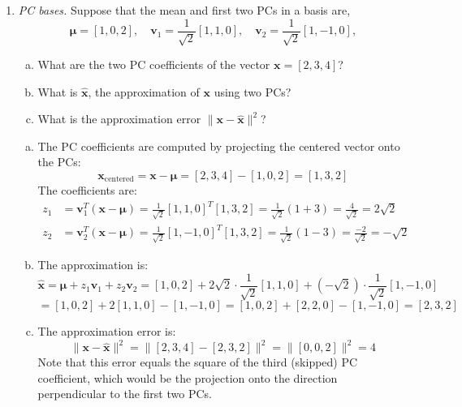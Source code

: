 \documentclass[11pt]{article}
\newcommand{\vbf}{\mathbf{v}}
\newcommand{\xbf}{\mathbf{x}}
\newcommand{\xbfhat}{\widehat{\mathbf{x}}}
\def\mubf{{\boldsymbol \mu}}
\begin{document}
\begin{enumerate}
\begin{solution}
\begin{enumerate}
\begin{python}
skipped_coeffs = Z[:, 2:]  # Skipped PCA coefficients
skipped_squared_sum = np.sum(skipped_coeffs**2)

# These should be equal (or very close)
\end{python}
The sum of squares of reconstruction errors equals the sum of squares of the skipped PCA coefficients because the reconstruction error is exactly the projection onto the discarded principal components.
\end{enumerate}
\end{solution}
 
\item \emph{PC bases.}  Suppose that the mean and first two PCs in a basis
 are,
\[
    \mubf = [1,0,2], \quad \vbf_1 = \frac{1}{\sqrt{2}}[1,1,0], \quad
    \vbf_2 = \frac{1}{\sqrt{2}}[1,-1,0], 
\]
\begin{enumerate}[(a)]
  \item What are the two PC coefficients of the vector $\xbf=[2,3,4]$?
  \item What is $\xbfhat$, the approximation of $\xbf$ using two PCs?
  \item What is the approximation error $\|\xbf-\xbfhat\|^2$?
\end{enumerate}

\begin{solution}
\begin{enumerate}[(a)]
\item The PC coefficients are computed by projecting the centered vector onto the PCs:
\[
\xbf_{\text{centered}} = \xbf - \mubf = [2,3,4] - [1,0,2] = [1,3,2]
\]
The coefficients are:
\begin{align*}
z_1 &= \vbf_1^T (\xbf - \mubf) = \frac{1}{\sqrt{2}}[1,1,0]^T [1,3,2] = \frac{1}{\sqrt{2}}(1 + 3) = \frac{4}{\sqrt{2}} = 2\sqrt{2} \\
z_2 &= \vbf_2^T (\xbf - \mubf) = \frac{1}{\sqrt{2}}[1,-1,0]^T [1,3,2] = \frac{1}{\sqrt{2}}(1 - 3) = \frac{-2}{\sqrt{2}} = -\sqrt{2}
\end{align*}

\item The approximation is:
\[
\xbfhat = \mubf + z_1 \vbf_1 + z_2 \vbf_2 = [1,0,2] + 2\sqrt{2} \cdot \frac{1}{\sqrt{2}}[1,1,0] + (-\sqrt{2}) \cdot \frac{1}{\sqrt{2}}[1,-1,0]
\]
\[
= [1,0,2] + 2[1,1,0] - [1,-1,0] = [1,0,2] + [2,2,0] - [1,-1,0] = [2,3,2]
\]

\item The approximation error is:
\[
\|\xbf-\xbfhat\|^2 = \|[2,3,4] - [2,3,2]\|^2 = \|[0,0,2]\|^2 = 4
\]
Note that this error equals the square of the third (skipped) PC coefficient, which would be the projection onto the direction perpendicular to the first two PCs.
\end{enumerate}
\end{solution}


\end{enumerate}
\end{document}
